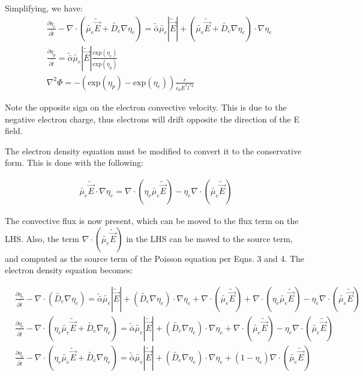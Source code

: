 \documentclass[11pt]{article}
\begin{document}
Simplifying, we have:
\begin{align}
    & \frac{\partial \eta_e}{\partial \tilde{t}} - \nabla \cdot \left( \tilde{\mu_e}\tilde{\vec{E}} + \tilde{D_e} \nabla \eta_e \right)  = \tilde{\bar{\alpha}}\tilde{\mu_e}|\tilde{\vec{E}}| + \left( \tilde{\mu_e}\tilde{\vec{E}}  +  \tilde{D_e}\nabla \eta_e  \right)\cdot \nabla \eta_e\\
    &\frac{\partial \eta_p}{\partial \tilde{t}} = \tilde{\bar{\alpha}} \tilde{\mu_e}|\tilde{\vec{E}}| \frac{\mathrm{exp}(\eta_e)}{\mathrm{exp}(\eta_p)}\\
    &\nabla^2\Phi = -\left( \mathrm{exp}(\eta_p)-\mathrm{exp}(\eta_e) \right) \frac{e}{\epsilon_0 E^* l^{*2}}
\end{align}

Note the opposite sign on the electron convective velocity. This is due to the negative electron charge, thus electrons will drift opposite the direction of the E field.

The electron density equation must be modified to convert it to the conservative form. This is done with the following:

\begin{align}
    \tilde{\mu_e}\tilde{\vec{E}} \cdot \nabla \eta_e = \nabla \cdot \left( \eta_e \tilde{\mu_e}\tilde{\vec{E}} \right) - \eta_e \nabla \cdot \left( \tilde{\mu_e}\tilde{\vec{E}} \right)
\end{align}

The convective flux is now present, which can be moved to the flux term on the LHS. Also, the term $\nabla \cdot \left( \tilde{\mu_e}\tilde{\vec{E}} \right)$ in the LHS can be moved to the source term, and computed as the source term of the Poisson equation per Eqns. 3 and 4. The electron density equation becomes:

\begin{align*}
    & \frac{\partial \eta_e}{\partial \tilde{t}} - \nabla \cdot \left( \tilde{D_e} \nabla \eta_e \right)  = \tilde{\bar{\alpha}}\tilde{\mu_e}|\tilde{\vec{E}}| + \left( \tilde{D_e}\nabla \eta_e  \right)\cdot \nabla \eta_e + \nabla \cdot \left( \tilde{\mu_e}\tilde{\vec{E}}\right) + \nabla \cdot \left( \eta_e \tilde{\mu_e}\tilde{\vec{E}} \right) - \eta_e \nabla \cdot \left( \tilde{\mu_e}\tilde{\vec{E}} \right) \\
    & \frac{\partial \eta_e}{\partial \tilde{t}} - \nabla \cdot \left( \eta_e \tilde{\mu_e}\tilde{\vec{E}}   + \tilde{D_e} \nabla \eta_e \right)  = \tilde{\bar{\alpha}}\tilde{\mu_e}|\tilde{\vec{E}}| + \left( \tilde{D_e}\nabla \eta_e  \right)\cdot \nabla \eta_e + \nabla \cdot \left( \tilde{\mu_e}\tilde{\vec{E}}\right) - \eta_e \nabla \cdot \left( \tilde{\mu_e}\tilde{\vec{E}} \right)\\
    & \frac{\partial \eta_e}{\partial \tilde{t}} - \nabla \cdot \left( \eta_e \tilde{\mu_e}\tilde{\vec{E}}   + \tilde{D_e} \nabla \eta_e \right)  = \tilde{\bar{\alpha}}\tilde{\mu_e}|\tilde{\vec{E}}| + \left( \tilde{D_e}\nabla \eta_e  \right)\cdot \nabla \eta_e + \left( 1- \eta_e \right) \nabla \cdot \left( \tilde{\mu_e}\tilde{\vec{E}}\right)
\end{align*}
\end{document}
